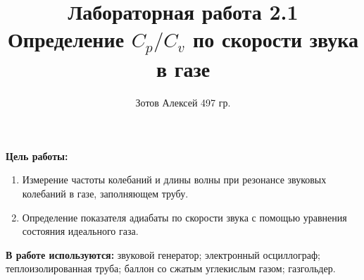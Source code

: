 \documentclass[11pt]{article}
\begin{document}
    \author {Зотов Алексей 497 гр.}
    \title {Лабораторная работа 2.1 \\  Определение $C_{p}/C_{v}$ по скорости звука в газе}
    \maketitle{}   

    \indent
    \textbf{Цель работы:}
         \begin{enumerate}
         \item Измерение частоты колебаний и длины волны при резонансе звуковых колебаний в газе, заполняющем трубу. 
         \item Определение показателя адиабаты по скорости звука с помощью уравнения состояния идеального газа.
         \end{enumerate}
    \indent
        
        \textbf{В работе используются:} звуковой генератор; электронный осциллограф; теплоизолированная труба; баллон со сжатым углекислым газом; газгольдер.

        
\end{document}
